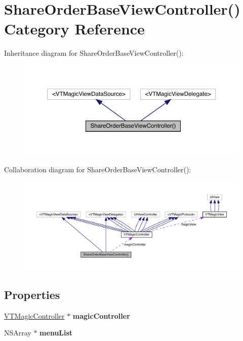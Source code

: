 \hypertarget{category_share_order_base_view_controller_07_08}{}\section{Share\+Order\+Base\+View\+Controller() Category Reference}
\label{category_share_order_base_view_controller_07_08}


Inheritance diagram for Share\+Order\+Base\+View\+Controller()\+:\nopagebreak
\begin{figure}[H]
\begin{center}
\leavevmode
\includegraphics[width=350pt]{category_share_order_base_view_controller_07_08__inherit__graph}
\end{center}
\end{figure}


Collaboration diagram for Share\+Order\+Base\+View\+Controller()\+:\nopagebreak
\begin{figure}[H]
\begin{center}
\leavevmode
\includegraphics[width=350pt]{category_share_order_base_view_controller_07_08__coll__graph}
\end{center}
\end{figure}
\subsection*{Properties}
\begin{DoxyCompactItemize}
\item 
\mbox{\label{category_share_order_base_view_controller_07_08_ae38b1f86ffda2b07754afb4e34ebf056}} 
\mbox{\hyperlink{interface_v_t_magic_controller}{V\+T\+Magic\+Controller}} $\ast$ {\bfseries magic\+Controller}
\item 
\mbox{\label{category_share_order_base_view_controller_07_08_a74037f3c472716578c908bd5bd5ea87b}} 
N\+S\+Array $\ast$ {\bfseries menu\+List}
\end{DoxyCompactItemize}


